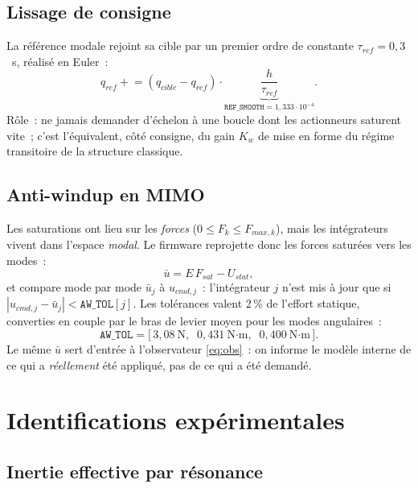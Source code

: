 \documentclass[a4paper,11pt]{article}
\newcommand{\qm}{q}
\newcommand{\e}[1]{\cdot 10^{#1}}
\begin{document}
\subsection{Lissage de consigne}

La référence modale rejoint sa cible par un premier ordre de constante
$\tau_{ref} = 0{,}3$~s, réalisé en Euler~:
\begin{equation}
    \qm_{ref} \mathrel{+}= (\qm_{cible} - \qm_{ref})\cdot
    \underbrace{\frac{h}{\tau_{ref}}}_{\texttt{REF\_SMOOTH} = 1{,}333\e{-4}} .
\end{equation}
Rôle~: ne jamais demander d'échelon à une boucle dont les actionneurs
saturent vite~; c'est l'équivalent, côté consigne, du gain $K_w$ de mise en
forme du régime transitoire de la structure classique.

\subsection{Anti-windup en MIMO}
\label{subsec:antiwindupmimo}

Les saturations ont lieu sur les \emph{forces} ($0 \le F_k \le F_{max,k}$),
mais les intégrateurs vivent dans l'espace \emph{modal}. Le firmware reprojette
donc les forces saturées vers les modes~:
\begin{equation}
    \bar u = E\,F_{sat} - U_{stat},
\end{equation}
et compare mode par mode $\bar u_j$ à $u_{cmd,j}$~: l'intégrateur $j$ n'est mis
à jour que si $|u_{cmd,j} - \bar u_j| < \texttt{AW\_TOL}[j]$. Les tolérances
valent 2\,\% de l'effort statique, converties en couple par le bras de levier
moyen pour les modes angulaires~:
\begin{equation}
    \texttt{AW\_TOL} = \big[\,3{,}08\ \text{N},\;\; 0{,}431\ \text{N·m},\;\;
    0{,}400\ \text{N·m}\,\big].
\end{equation}
Le même $\bar u$ sert d'entrée à l'observateur \eqref{eq:obs}~: on informe le
modèle interne de ce qui a \emph{réellement} été appliqué, pas de ce qui a été
demandé.

\section{Identifications expérimentales}
\label{sec:ident}

\subsection{Inertie effective par résonance}
\label{subsec:identres}
\end{document}

